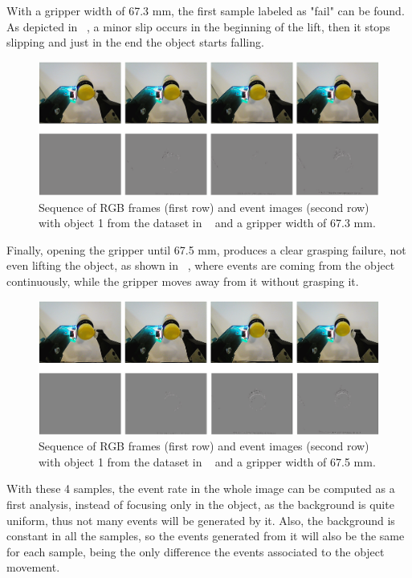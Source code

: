 With a gripper width of 67.3 mm, the first sample labeled as "fail" can be found. As depicted in ~, a minor slip occurs in the beginning of the lift, then it stops slipping and just in the end the object starts falling.\\

\begin{figure}[h]
    \centering
    \includegraphics[width=\textwidth]{resources/images/gelsight_case3}
    \caption{Sequence of RGB frames (first row) and event images (second row) with object 1 from the dataset in ~\cite{gelsight2018} and a gripper width of 67.3 mm.}\label{fig:gelsight_case3}
\end{figure}

Finally, opening the gripper until 67.5 mm, produces a clear grasping failure, not even lifting the object, as shown in ~, where events are coming from the object continuously, while the gripper moves away from it without grasping it.\\

\begin{figure}[h]
    \centering
    \includegraphics[width=\textwidth]{resources/images/gelsight_case4}
    \caption{Sequence of RGB frames (first row) and event images (second row) with object 1 from the dataset in ~\cite{gelsight2018} and a gripper width of 67.5 mm.}\label{fig:gelsight_case4}
\end{figure}

With these 4 samples, the event rate in the whole image can be computed as a first analysis, instead of focusing only in the object, as the background is quite uniform, thus not many events will be generated by it. Also, the background is constant in all the samples, so the events generated from it will also be the same for each sample, being the only difference the events associated to the object movement.

